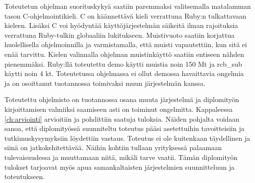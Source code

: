 Toteutetun ohjelman suorituskykyä saatiin paremmaksi valitsemalla matalamman tason C-ohjelmointikieli. C on käännettävä kieli verrattuna Ruby:n tulkattavaan kieleen. Lisäksi C voi hyödyntää käyttöjärjestelmän säikeitä ilman rajoituksia verrattuna Ruby-tulkin globaaliin lukitukseen. Muistivuoto saatiin korjattua huolellisella ohjelmoinnilla ja varmistamalla, että muisti vapautettiin, kun sitä ei enää tarvittu. Kielen valinnalla ohjelman muistinkäyttö saatiin entiseen nähden pienemmäksi. Ruby:llä toteutettu demo käytti muistia noin 150 Mt ja rcb\_sub käytti noin 4 kt. Toteutetussa ohjelmassa ei ollut demossa havaittavia ongelmia ja on osoittanut tuotannossa toimivaksi muun järjestelmän kanssa.

Toteutettu ohjelmisto on tuotannossa osana muuta järjestelmä ja diplomityön kirjoittamisen valmiiksi saamiseen asti on toiminut ongelmitta. Kappaleessa \ref{ch:arviointi} arvioitiin ja pohdittiin saatuja tuloksia. Näiden pohjalta voidaan sanoa, että diplomityössä suunniteltu toteutus pääsi asetettuihin tavoitteisiin ja tutkimuskysymyksiin löydettiin vastaus. Toteutus ei ole kuitenkaan täydellinen ja siinä on jatkokehitettävää. Näihin kohtiin tullaan yrityksessä palaamaan tulevaisuudessa ja muuttamaan niitä, mikäli tarve vaatii. Tämän diplomityön tulokset tarjoavat myös apua samankaltaisten järjestelmien suunnitteluun ja toteutukseen.

